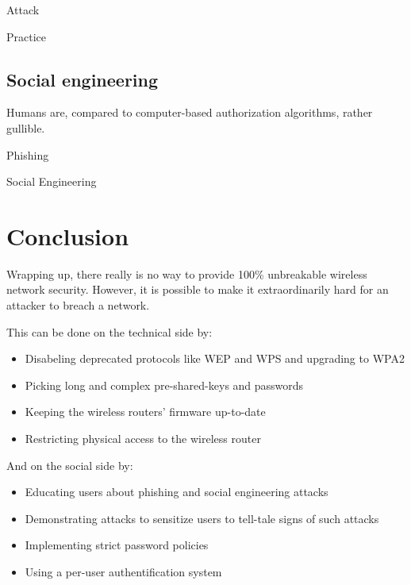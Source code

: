 Attack

Practice

\subsection{Social engineering}
\label{sec:attackuser}

Humans are, compared to computer-based authorization algorithms, rather gullible. 

Phishing

Social Engineering

\section{Conclusion}

Wrapping up, there really is no way to provide 100\% unbreakable wireless network security. However, it is possible to make it extraordinarily hard for an attacker to breach a network. 

This can be done on the technical side by:

\begin{itemize}

\item{Disabeling deprecated protocols like WEP and WPS and upgrading to WPA2}

\item{Picking long and complex pre-shared-keys and passwords}

\item{Keeping the wireless routers' firmware up-to-date}

\item{Restricting physical access to the wireless router}

\end{itemize}

And on the social side by:

\begin{itemize}

\item{Educating users about phishing and social engineering attacks}

\item{Demonstrating attacks to sensitize users to tell-tale signs of such attacks}

\item{Implementing strict password policies}

\item{Using a per-user authentification system}

\end{itemize}